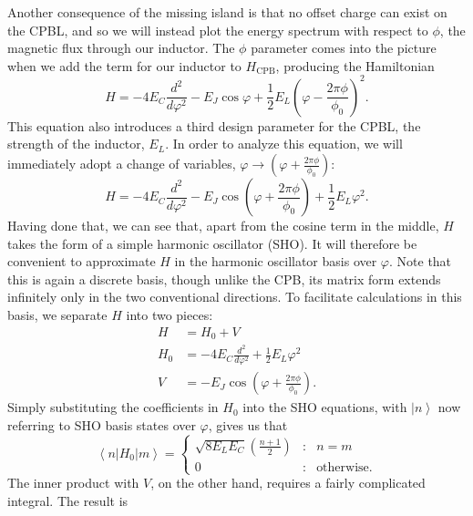 \documentclass[twocolumn]{revtex4}
\newcommand{\ket}[1]{\left| #1 \right>}
\newcommand{\innerp}[3]{\left< #1 | #2 | #3 \right>}
\begin{document}
Another consequence of the missing island is that no offset charge can
exist on the CPBL, and so we will instead plot the energy spectrum
with respect to $\phi$, the magnetic flux through our inductor. The
$\phi$ parameter comes into the picture when we add the term for our
inductor to $H_{\text{CPB}}$, producing the Hamiltonian
\begin{equation}
  H = -4E_C\frac{d^2}{d\varphi^2}-E_J\cos{\varphi}+\frac{1}{2}
  E_L\left(\varphi-\frac{2\pi\phi}{\phi_0} \right)^2.
\end{equation}
This equation also introduces a third design parameter for the CPBL,
the strength of the inductor, $E_L$. In order to analyze this
equation, we will immediately adopt a change of variables, $\varphi
\rightarrow (\varphi + \frac{2\pi\phi}{\phi_0})$:
\begin{equation}
  H = -4E_C\frac{d^2}{d\varphi^2}-E_J\cos\left(\varphi+
    \frac{2\pi\phi}{\phi_0}\right)+
  \frac{1}{2} E_L\varphi^2.
\end{equation}
Having done that, we can see that, apart from the cosine term in the
middle, $H$ takes the form of a simple harmonic oscillator (SHO). It will
therefore be convenient to approximate $H$ in the harmonic oscillator
basis over $\varphi$. Note that this is again a discrete basis, though
unlike the CPB, its matrix form extends infinitely only in the two
conventional directions. To facilitate calculations in this basis, we
separate $H$ into two pieces:
\begin{align}
  H & = H_0 + V\\
  H_0 & = -4E_C\frac{d^2}{d\varphi^2} +
  \frac{1}{2} E_L\varphi^2 \\
  V & = -E_J\cos\left(\varphi + \frac{2\pi\phi}{\phi_0}\right).
\end{align}
Simply substituting the coefficients in $H_0$ into the SHO equations,
with $\ket{n}$ now referring to SHO basis states over $\varphi$, gives
us that
\begin{equation}
  \innerp{n}{H_0}{m} = \left\{\begin{array}{lcl}
      \sqrt{8E_LE_C}\left(\frac{n+1}{2}\right) & : &n=m \\
      0 & : & \text{otherwise.}
    \end{array}\right.
  \label{inner-H0}
\end{equation}
The inner product with $V$, on the other hand, requires a fairly
complicated integral. The result is
\end{document}
